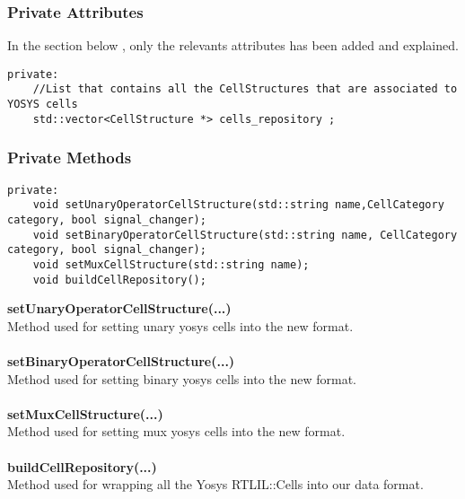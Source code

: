 \documentclass{article}
\begin{document}
\subsubsection{Private Attributes}

In the section below , only the relevants attributes has been added and explained.\\

\begin{mdframed}[hidealllines=true, backgroundcolor=magenta!10]
	\begin{lstlisting}[basicstyle=\tiny]
private:
	//List that contains all the CellStructures that are associated to YOSYS cells
	std::vector<CellStructure *> cells_repository ;
	\end{lstlisting}
\end{mdframed}

\subsubsection{Private Methods}

\begin{mdframed}[hidealllines=true, backgroundcolor=magenta!10]
	\begin{lstlisting}[basicstyle=\tiny]
private:
	void setUnaryOperatorCellStructure(std::string name,CellCategory category, bool signal_changer);
	void setBinaryOperatorCellStructure(std::string name, CellCategory category, bool signal_changer);
	void setMuxCellStructure(std::string name);
	void buildCellRepository();
	\end{lstlisting}
\end{mdframed}

\textbf{setUnaryOperatorCellStructure(...)}\\
Method used for setting unary yosys cells into the new format.\\\\

\textbf{setBinaryOperatorCellStructure(...)}\\
Method used for setting binary yosys cells into the new format.\\\\

\textbf{setMuxCellStructure(...)}\\
Method used for setting mux yosys cells into the new format.\\\\

\textbf{buildCellRepository(...)}\\
Method used for wrapping all the Yosys RTLIL::Cells into our data format.\\\\
\end{document}
